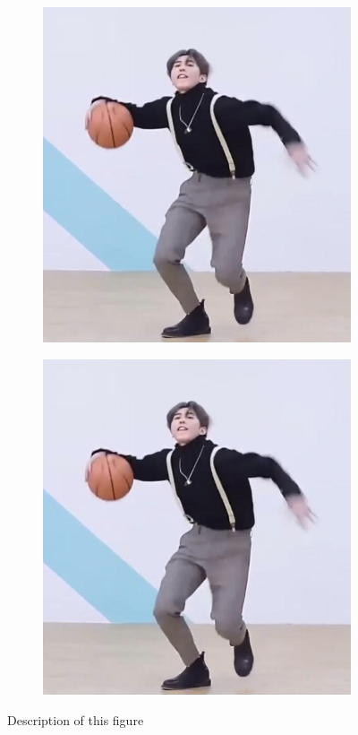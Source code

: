 \begin{figure}[H]
{\begin{subfigure}{0.3 \textwidth}
    {\includegraphics[width=\textwidth]{chapters/chapter02/fig02/2.5.png}
    \caption{}\label{Fig.2.1.b}}
\end{subfigure}
%
\begin{subfigure}{0.3 \textwidth}
    \centering
    {\includegraphics[width=\textwidth]{chapters/chapter02/fig02/2.5.png}
    \caption{}\label{Fig.2.1.c}}
\end{subfigure}

\caption{Description of this figure}
\label{Fig.2.1}
}
\end{figure}
%
